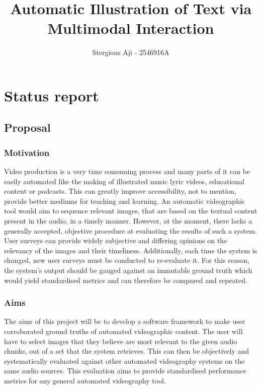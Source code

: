 \documentclass[11pt]{article}
\title{Automatic Illustration of Text via Multimodal Interaction}
\author{Stergious Aji - 2546916A}
\begin{document}
\maketitle

\section{Status report}

\subsection{Proposal}\label{proposal}
\subsubsection{Motivation}\label{motivation}
Video production is a very time consuming process and many parts of it can be easily automated like the making of illustrated music lyric videos, educational content or podcasts. This can greatly improve accessibility, not to mention, provide better mediums for teaching and learning. An automatic videographic tool would aim to sequence relevant images, that are based on the textual content present in the audio, in a timely manner. However, at the moment, there lacks a generally accepted, objective procedure at evaluating the results of such a system. User surveys can provide widely subjective and differing opinions on the relevancy of the images and their timeliness. Additionally, each time the system is changed, new user surveys must be conducted to re-evaluate it. For this reason, the system's output should be gauged against an immutable ground truth which would yield standardised metrics and can therefore be compared and repeated.


\subsubsection{Aims}\label{aims}
The aims of this project will be to develop a software framework to make user corroborated ground truths of automated videographic content. The user will have to select images that they believe are most relevant to the given audio chunks, out of a set that the system retrieves. This can then be objectively and systematically evaluated against other automated videography systems on the same audio sources. This evaluation aims to provide standardised performance metrics for any general automated videography tool.
\end{document}
